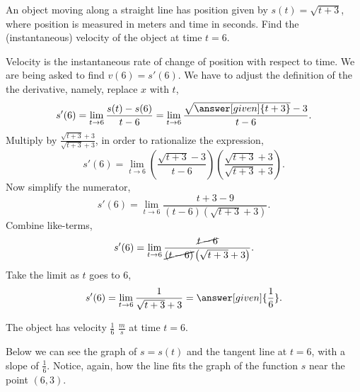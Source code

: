 \documentclass{ximera}
\begin{document}
\begin{example}
	An object moving along a straight line has position given by
	$s(t) = \sqrt{t+3}$, where position is measured in meters and time in seconds.  Find the (instantaneous) velocity of the object at time $t=6$.
	  \begin{explanation}
		    Velocity is the instantaneous rate of change of position with respect to
		    time.  We are being asked to find $v(6)=s'(6)$.  We have to adjust the
		    definition of the the derivative, namely, replace $x$ with $t$,
		    \[ s'(6) = \lim_{t \to 6} \frac{s(t)-s(6)}{t-6} = \lim_{t\to 6} \frac{\sqrt{\answer[given]{t+3}}-3}{t-6}. \]
		    Multiply by $\frac{\sqrt{t+3}+3}{\sqrt{t+3}+3}$, in order to rationalize the expression,
		    \[ s'(6) = \lim_{t\to 6} \left(\frac{\sqrt{t+3}-3}{t-6} \right)\left(\frac{\sqrt{t+3}+3}{\sqrt{t+3}+3} \right). \]		
		    Now simplify the numerator,
		    \[ s'(6) = \lim_{t \to 6} \frac{t+3 - 9}{(t-6)\left(\sqrt{t+3}+3 \right)}. \]
		    Combine like-terms,
		    \[ s'(6)= \lim_{t \to 6} \frac{\cancel{t-6}}{\cancel{(t-6)}\left(\sqrt{t+3}+3\right)}. \]
		     Take the limit as $t$ goes to $6$,
		    \[ s'(6)= \lim_{t\to 6} \frac{1}{\sqrt{t+3}+3}=\answer[given]{\frac{1}{6}}. \]
		  
		   
		  The object has velocity $\frac{1}{6}$ $\frac{\unit{m}}{\unit{s}}$ at time $t=6$.
		    
		\begin{onlineOnly}
			Below we can see the graph of $s=s(t)$ and the tangent line at $t=6$, with a slope of $\frac{1}{6}$. 
			Notice, again, how the line fits the graph of the function $s$ near the point $(6,3)$. 
			\begin{image}\end{image}
		\end{onlineOnly}
	\end{explanation}
\end{example}
\end{document}
